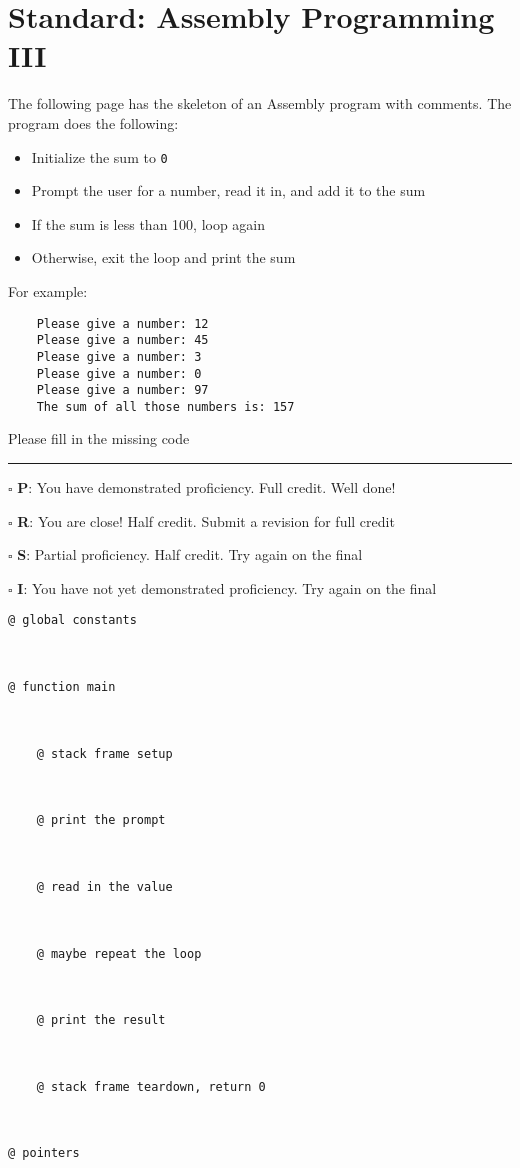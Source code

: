 \documentclass[12pt]{article}
\begin{document}
\newpage

\section*{Standard: Assembly Programming III}


The following page has the skeleton of an Assembly program with comments. The program does the following:
\begin{itemize}
    \item Initialize the sum to \texttt{0}
    \item Prompt the user for a number, read it in, and add it to the sum
    \item If the sum is less than 100, loop again
    \item Otherwise, exit the loop and print the sum
\end{itemize}

For example:
\begin{verbatim}
    Please give a number: 12
    Please give a number: 45
    Please give a number: 3
    Please give a number: 0
    Please give a number: 97
    The sum of all those numbers is: 157
\end{verbatim}

Please fill in the missing code

\vfill

\rule[1ex]{\textwidth}{.1pt}

$\square$ \textbf{P}: You have demonstrated proficiency. Full credit. Well done!

$\square$ \textbf{R}: You are close! Half credit. Submit a revision for full credit

$\square$ \textbf{S}: Partial proficiency. Half credit. Try again on the final

$\square$ \textbf{I}: You have not yet demonstrated proficiency. Try again on the final

\newpage

\begin{verbatim}
@ global constants



@ function main

    
    
    @ stack frame setup



    @ print the prompt



    @ read in the value



    @ maybe repeat the loop

    
    
    @ print the result



    @ stack frame teardown, return 0



@ pointers
\end{verbatim}
\end{document}
